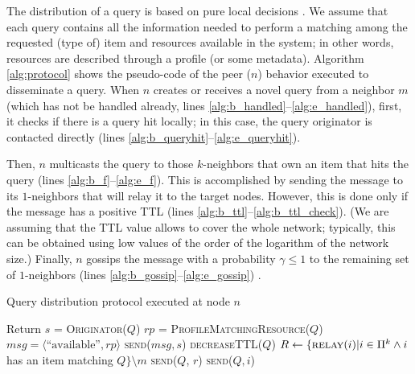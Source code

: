\documentclass{sig-alternate}
\begin{document}
The distribution of a query is based on pure local decisions \cite{disio11}. 
We assume that each query contains all the information needed to perform a matching among the requested (type of) item and resources available in the system; in other words, resources are described through a profile (or some metadata).
Algorithm \ref{alg:protocol} shows the pseudo-code of the peer ($n$) behavior executed to disseminate a query. When $n$ creates or receives a novel query from a neighbor $m$ (which has not be handled already, lines \ref{alg:b_handled}--\ref{alg:e_handled}), first, it checks if there is a query hit locally; in this case, the query originator is contacted directly (lines \ref{alg:b_queryhit}--\ref{alg:e_queryhit}). 

Then, $n$ multicasts the query to those $k$-neighbors that own an item that hits the query (lines \ref{alg:b_f}--\ref{alg:e_f}). This is accomplished by sending the message to its $1$-neighbors that will relay it to the target nodes. However, this is done only if the message has a positive \ac{TTL} (lines \ref{alg:b_ttl}--\ref{alg:b_ttl_check}). (We are assuming that the TTL value allows to cover the whole network; typically, this can be obtained using low values of the order of the logarithm of the network size.)
Finally, $n$ gossips the message with a probability $\gamma \leq 1$  to the remaining set of $1$-neighbors (lines \ref{alg:b_gossip}--\ref{alg:e_gossip}) \cite{disio11}.

\begin{algorithm}[t]
\caption{Query distribution protocol executed at node $n$}
\label{alg:protocol}
\begin{small}
\begin{algorithmic}[1]
 \label{alg:b_handled} 
  \STATE Return
\ENDIF \label{alg:e_handled}
 \label{alg:b_queryhit}\hfill{} 
  \STATE $s$ = \textsc{Originator($Q$)}
  \STATE $rp$ = \textsc{ProfileMatchingResource($Q$)}
  \STATE $msg = \langle \text{``available''}, rp \rangle$
  \STATE \textsc{send}($msg, s$)\ENDIF \label{alg:e_queryhit}
\STATE \textsc{decreaseTTL}($Q$) \label{alg:b_ttl} 
 \label{alg:b_ttl_check}\hfill{}
\STATE $R \leftarrow \{ \text{\textsc{relay}}(i) | i \in \Pi^k \wedge i$  has an item matching $Q\} \setminus m$ \label{alg:b_f}
   \STATE \textsc{send}($Q$, $r$)\ENDFOR \label{alg:e_f}
  \hfill{}\label{alg:b_gossip}
       \STATE \textsc{send}($Q,i$)\ENDIF \ENDFOR \label{alg:e_gossip}
\ENDIF \label{alg:e_ttl}
\end{algorithmic}
\end{small}
\end{algorithm}
\end{document}

